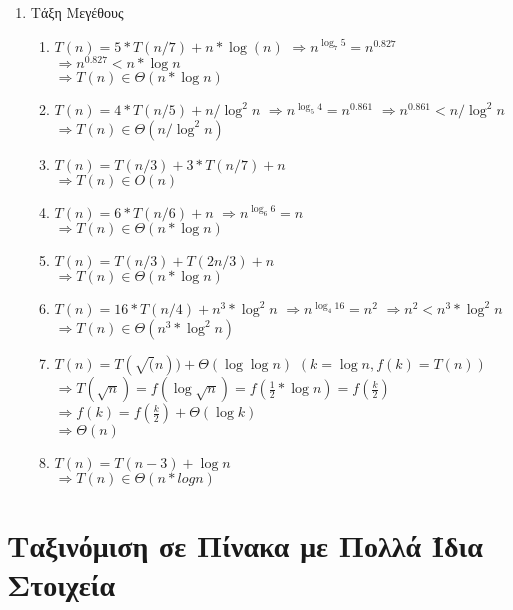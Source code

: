 \documentclass[a4paper,10pt]{article} \usepackage{anysize}
\begin{document}
\begin{enumerate}
\begin{tabular}{l l}
\end{tabular}

\item Τάξη Μεγέθους
\begin{enumerate}
\item $T(n)=5*T(n/7)+n*\log(n)$
$\Rightarrow n^{\log _7 {5}} = n^{0.827}$
$\Rightarrow n^{0.827} < n*\log{n}$\\
$\Rightarrow T(n) \in \Theta(n*\log{n})$

\item $T(n) = 4*T(n/5)+n/\log^2{n}$
$\Rightarrow n^{\log_5 {4}} = n^{0.861}$
$\Rightarrow n^{0.861} < n/\log^2{n}$\\
$\Rightarrow T(n) \in \Theta(n/\log^2{n})$

\item $T(n) = T(n/3) +3*T(n/7)+n$\\
$\Rightarrow T(n) \in O(n)$

\item $T(n) = 6*T(n/6)+n$
$\Rightarrow n^{\log _6 {6}} = n$\\
$\Rightarrow T(n) \in \Theta(n*\log {n})$

\item $T(n) = T(n/3) + T(2n/3) + n$\\
$\Rightarrow T(n) \in \Theta(n*\log{n})$

\item $T(n) = 16*T(n/4) + n^3*\log^2{n}$
$\Rightarrow n^{\log _4{16}} = n^2$
$\Rightarrow n^2 < n^3*\log^2{n}$\\
$\Rightarrow T(n) \in \Theta(n^3*\log^2{n})$

\item $T(n) = T(\sqrt(n)) + \Theta(\log{\log{n}})$
$(k=\log{n},f(k)=T(n))$\\
$\Rightarrow
T(\sqrt{n})=f(\log{\sqrt{n}})=f(\frac{1}{2}*\log{n})=f(\frac{k}{2}) $\\
$\Rightarrow f(k)=f(\frac{k}{2})+\Theta(\log{k})$\\
$\Rightarrow \Theta(n)$

\item $T(n) = T(n-3) + \log{n}$\\
$\Rightarrow T(n) \in \Theta(n*logn)$

\end{enumerate}
\end{enumerate}

\section{Ταξινόμιση σε Πίνακα με Πολλά Ίδια Στοιχεία}
\end{document}
